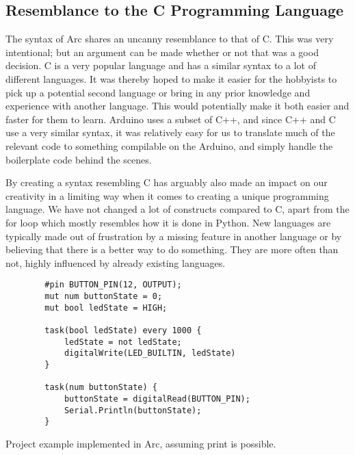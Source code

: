 \subsection{Resemblance to the C Programming Language}

The syntax of Arc shares an uncanny resemblance to that of C. This was very intentional; but an argument can be made whether or not that was a good decision. C is a very popular language and has a similar syntax to a lot of different languages. It was thereby hoped to make it easier for the hobbyists to pick up a potential second language or bring in any prior knowledge and experience with another language. This would potentially make it both easier and faster for them to learn. Arduino uses a subset of C++, and since C++ and C use a very similar syntax, it was relatively easy for us to translate much of the relevant code to something compilable on the Arduino, and simply handle the boilerplate code behind the scenes.

By creating a syntax resembling C has arguably also made an impact on our creativity  in a limiting way when it comes to creating a unique programming language. We have not changed a lot of constructs compared to C, apart from the for loop which mostly resembles how it is done in Python. New languages are typically made out of frustration by a missing feature in another language or by believing that there is a better way to do something. They are more often than not, highly influenced by already existing languages.


\begin{listing}[htb!]
    \begin{verbatim}
        #pin BUTTON_PIN(12, OUTPUT);
        mut num buttonState = 0;
        mut bool ledState = HIGH;

        task(bool ledState) every 1000 {
            ledState = not ledState;
            digitalWrite(LED_BUILTIN, ledState)
        }

        task(num buttonState) {
            buttonState = digitalRead(BUTTON_PIN);
            Serial.Println(buttonState);
        }
    \end{verbatim}
    \caption{Project example implemented in Arc, assuming print is possible.}
    \label{lst:arcexample}
\end{listing}